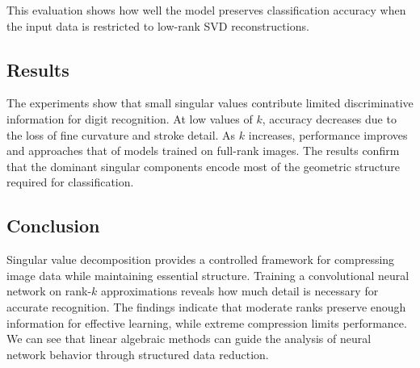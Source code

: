 \documentclass[11pt]{article}
\begin{document}
This evaluation shows how well the model preserves classification accuracy when the input data is restricted to low-rank SVD reconstructions.
\subsection*{Results}
The experiments show that small singular values contribute limited discriminative information for digit recognition. At low values of \(k\), accuracy decreases due to the loss of fine curvature and stroke detail. As \(k\) increases, performance improves and approaches that of models trained on full-rank images. The results confirm that the dominant singular components encode most of the geometric structure required for classification.

\subsection*{Conclusion}
Singular value decomposition provides a controlled framework for compressing image data while maintaining essential structure. Training a convolutional neural network on rank-\(k\) approximations reveals how much detail is necessary for accurate recognition. The findings indicate that moderate ranks preserve enough information for effective learning, while extreme compression limits performance. We can see that linear algebraic methods can guide the analysis of neural network behavior through structured data reduction.
\end{document}
